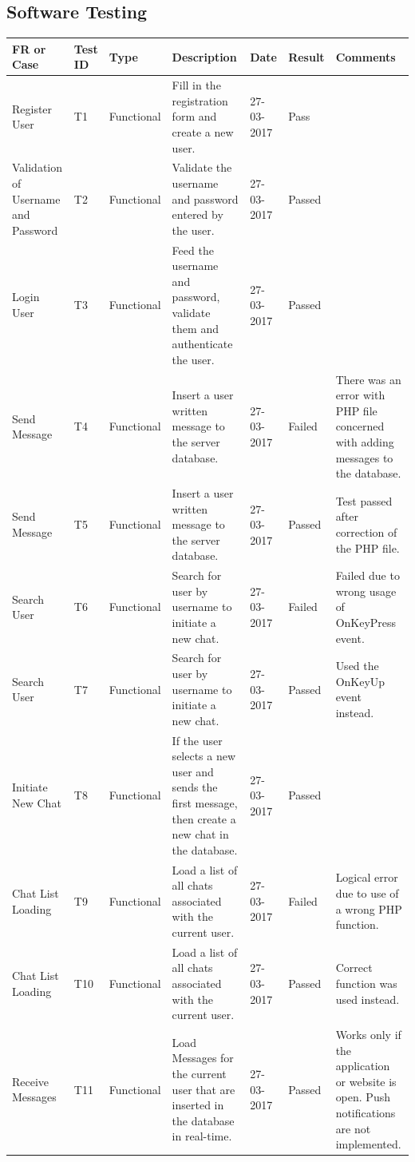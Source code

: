 \documentclass{article}
\begin{document}
\begin{appendices}
\section{Software Testing}
\begin{center}
 \begin{longtable}{| p{1.5cm} | p{1cm} | p{1.5cm} | p{2.5cm} | p{1cm} | p{1cm} | p{2.5cm} |} 
 \hline
 FR or Case & Test ID & Type & Description & Date & Result & Comments\\ [0.5ex] 
 \hline\hline
Register User & T1 & Functional & Fill in the registration form and create a new user. & 27-03-2017 & Pass & \\
\hline
Validation of Username and Password & T2 & Functional & Validate the username and password entered by the user. & 27-03-2017 & Passed &\\
\hline
Login User & T3 & Functional & Feed the username and password, validate them and authenticate the user. & 27-03-2017 & Passed &\\
\hline
Send Message & T4 & Functional & Insert a user written message to the server database. & 27-03-2017 & Failed & There was an error with PHP file concerned with adding messages to the database. \\
\hline
Send Message & T5 & Functional & Insert a user written message to the server database. & 27-03-2017 & Passed & Test passed after correction of the PHP file. \\
\hline
Search User & T6 & Functional & Search for user by username to initiate a new chat. & 27-03-2017 & Failed & Failed due to wrong usage of OnKeyPress event. \\
\hline
Search User & T7 & Functional & Search for user by username to initiate a new chat. & 27-03-2017 & Passed & Used the OnKeyUp event instead. \\
\hline
Initiate New Chat & T8 & Functional & If the user selects a new user and sends the first message, then create a new chat in the database. & 27-03-2017 & Passed &\\
\hline
Chat List Loading & T9 & Functional & Load a list of all chats associated with the current user. & 27-03-2017 & Failed & Logical error due to use of a wrong PHP function. \\
\hline
Chat List Loading & T10 & Functional & Load a list of all chats associated with the current user. & 27-03-2017 & Passed & Correct function was used instead. \\
\hline
Receive Messages & T11 & Functional & Load Messages for the current user that are inserted in the database in real-time. & 27-03-2017 & Passed & Works only if the application or website is open. Push notifications are not implemented. \\
\hline
\end{longtable}
\end{center}


\end{appendices}
\end{document}
